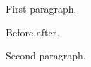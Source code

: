 \documentclass{article}
\begin{document}
First paragraph.\clearpage

Before \grab after.

Second paragraph.
\end{document}
